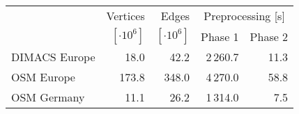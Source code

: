 \begin{tabular}{lrrrr}
\toprule
 & Vertices       & Edges          & \multicolumn{2}{c}{Preprocessing [s]} \\ \cmidrule(lr){4-5} & $[\cdot 10^6]$ & $[\cdot 10^6]$ & Phase 1 & Phase 2 \\
\midrule
DIMACS Europe &       18.0 &       42.2 &        2\,260.7 &          11.3 \\
OSM Europe    &      173.8 &      348.0 &        4\,270.0 &          58.8 \\
OSM Germany   &       11.1 &       26.2 &        1\,314.0 &           7.5 \\
\bottomrule
\end{tabular}

